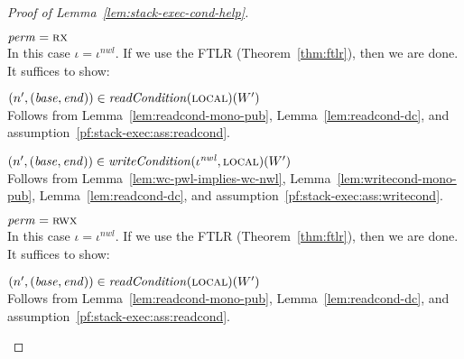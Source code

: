 \documentclass[a4paper]{article}
\newcommand{\var}[1]{\mathit{#1}}
\newcommand{\start}{\var{base}}
\newcommand{\addrend}{\var{end}}
\newcommand{\perm}{\var{perm}}
\newcommand{\nwl}{\var{nwl}}
\newcommand{\plainfun}[2]{
  \ifthenelse{\equal{#2}{}}
  {\mathit{#1}}
  {\mathit{#1}(#2)}
}
\newcommand{\readCond}[1]{\plainfun{readCondition}{#1}}
\newcommand{\writeCond}[1]{\plainfun{writeCondition}{#1}}
\newcommand{\npair}[2][n]{\left(#1,#2 \right)}
\newcommand{\plainperm}[1]{\textsc{#1}}
\newcommand{\exec}{\plainperm{rx}}
\newcommand{\rwx}{\plainperm{rwx}}
\newcommand{\local}{\plainperm{local}}
\begin{document}
\begin{proof}[Proof of Lemma~\ref{lem:stack-exec-cond-help}]
\begin{enumproof}[resume]
  \item $\perm = \exec$\\
    In this case $\iota= \iota^\nwl$. If we use the FTLR (Theorem~\ref{thm:ftlr}), then we are done. It suffices to show:
    \begin{enumproof}
      \item $\npair[n']{(\start,\addrend)} \in \readCond{}(\local)(W')$ \\
        Follows from Lemma~\ref{lem:readcond-mono-pub}, Lemma~\ref{lem:readcond-dc}, and assumption~\ref{pf:stack-exec:ass:readcond}.
      \item $\npair[n']{(\start,\addrend)} \in \writeCond{}(\iota^\nwl,\local)(W')$\\
        Follows from Lemma~\ref{lem:wc-pwl-implies-wc-nwl}, Lemma~\ref{lem:writecond-mono-pub}, Lemma~\ref{lem:readcond-dc}, and assumption~\ref{pf:stack-exec:ass:writecond}.
    \end{enumproof}
  \item $\perm = \rwx$\\
    In this case $\iota= \iota^\nwl$. If we use the FTLR (Theorem~\ref{thm:ftlr}), then we are done. It suffices to show:
    \begin{enumproof}
      \item $\npair[n']{(\start,\addrend)} \in \readCond{}(\local)(W')$ \\
        Follows from Lemma~\ref{lem:readcond-mono-pub}, Lemma~\ref{lem:readcond-dc}, and assumption~\ref{pf:stack-exec:ass:readcond}.
      \end{enumproof}
\end{enumproof}
\end{proof}
\end{document}
